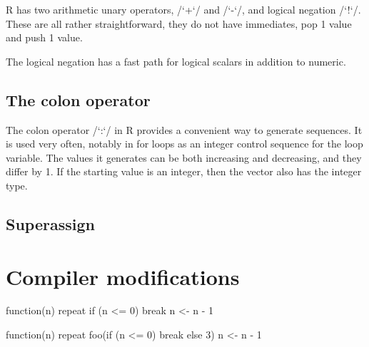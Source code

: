R has two arithmetic unary operators, \rinline/`+`/ and \rinline/`-`/, and logical negation \rinline/`!`/. These are all rather straightforward, they do not have immediates, pop 1 value and push 1 value.

The logical negation has a fast path for logical scalars in addition to numeric.


\subsection{The colon operator}

The colon operator \rinline/`:`/ in R provides a convenient way to generate sequences. It is used very often, notably in \todo[verb]for loops as an integer control sequence for the loop variable. The values it generates can be both increasing and decreasing, and they differ by 1. If the starting value is an integer, then the vector also has the integer type.

\todo


\subsection{Superassign}

\blind


\section{Compiler modifications}



\begin{listing}[htbp]
  \caption{\label{lst:local-break}Safe \rinline/break/}
  \begin{rcode}
function(n) {
    repeat {
        if (n <= 0) break
        n <- n - 1
    }
}
  \end{rcode}
\end{listing}

\begin{listing}[htbp]
  \caption{\label{lst:non-local-break}Context for \rinline/break/ required}
  \begin{rcode}
function(n) {
    repeat {
        foo(if (n <= 0) break else 3)
        n <- n - 1
    }
}
  \end{rcode}
\end{listing}

